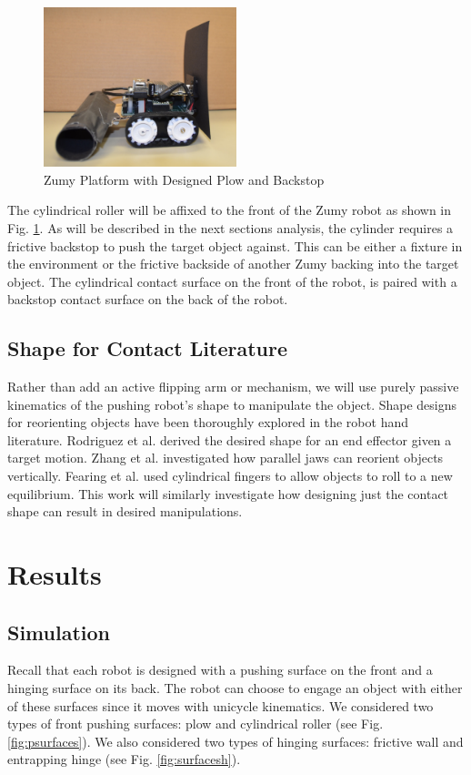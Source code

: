 \documentclass[runningheads,a4paper]{llncs}
\begin{document}
\begin{figure}
\centering
\includegraphics[width=0.5\textwidth]{EquippedZumy.jpg}
\caption{\label{fig:zumy}Zumy Platform with Designed Plow and Backstop}
\end{figure}

The cylindrical roller will be affixed to the front of the Zumy robot as shown in Fig. \ref{fig:zumy}.
As will be described in the next sections analysis, the cylinder requires a frictive backstop to push the target object against.
This can be either a fixture in the environment or the frictive backside of another Zumy backing into the target object.
The cylindrical contact surface on the front of the robot, is paired with a backstop contact surface on the back of the robot.

\subsection{Shape for Contact Literature}
Rather than add an active flipping arm or mechanism, we will use purely passive kinematics of the pushing robot's shape to manipulate the object.
Shape designs for reorienting objects have been thoroughly explored in the robot hand literature.
Rodriguez et al.\cite{rodriguez2013effector} derived the desired shape for an end effector given a target motion.
Zhang et al.\cite{zhang2002gripper} investigated how parallel jaws can reorient objects vertically.
Fearing et al. \cite{fearing1986simplified} used cylindrical fingers to allow objects to roll to a new equilibrium.
This work will similarly investigate how designing just the contact shape can result in desired manipulations.

\clearpage
\section{Results}
\subsection{Simulation}
Recall that each robot is designed with a pushing surface on the front and a hinging surface on its back.
The robot can choose to engage an object with either of these surfaces since it moves with unicycle kinematics.
We considered two types of front pushing surfaces: plow and cylindrical roller (see Fig. \ref{fig:psurfaces}).
We also considered two types of hinging surfaces: frictive wall and entrapping hinge (see Fig. \ref{fig:surfacesh}).
\end{document}
